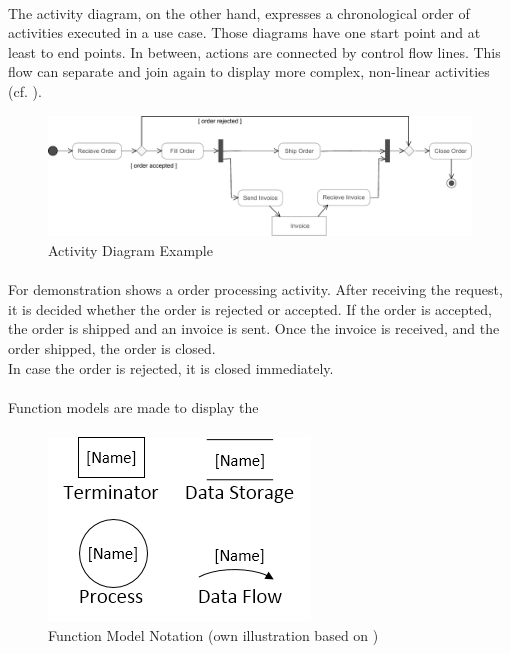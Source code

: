 \paragraph{} The activity diagram, on the other hand, expresses a chronological order of activities executed in a use case. Those diagrams have one start point and at least to end points. In between, actions are connected by control flow lines. This flow can separate and join again to display more complex, non-linear activities  (cf. ).

\begin{figure}[H]
    \centering
    \includegraphics[width=\textwidth]{img/ActivityExample.pdf}
    \caption{Activity Diagram Example \parencite[380]{ObjectManagementGroup.01.03.2015}}\label{fig:adEx}
\end{figure}

\paragraph{} For demonstration  shows a order processing activity. After receiving the request, it is decided whether the order is rejected or accepted. If the order is accepted, the order is shipped and an invoice is sent. Once the invoice is received, and the order shipped, the order is closed. \\
In case the order is rejected, it is closed immediately. 


\paragraph{} Function models are made to display the 

\paragraph{} 
\begin{figure}[H]
    \centering
    \includegraphics[scale=0.9]{img/fmSymb.png}
    \caption[Function Model Notation]{Function Model Notation (own illustration based on \cite[190]{Pohl.2007})}
    \label{fig:fmSymb}
\end{figure}

